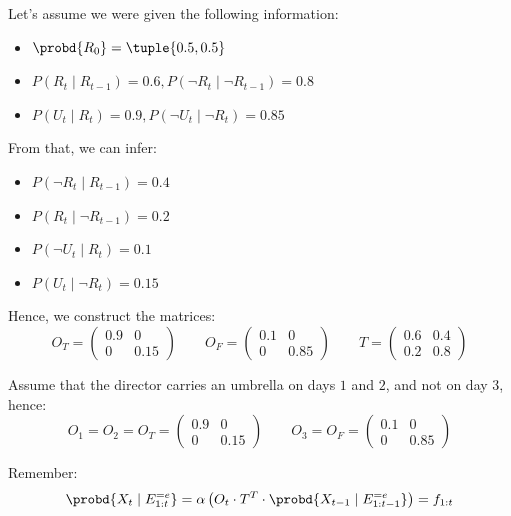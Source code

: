 
Let's assume we were given the following information:
\begin{itemize}
  \item $\probd{R_0} = \tuple{0.5, 0.5}$
  \item $P(R_{t} \mid R_{t-1}) = 0.6, P(\neg R_{t} \mid \neg R_{t-1}) = 0.8$
  \item $P(U_{t} \mid R_{t}) = 0.9, P(\neg U_{t} \mid \neg R_{t}) = 0.85$
\end{itemize}

From that, we can infer: 
\begin{itemize}
  \item $P(\neg R_{t} \mid R_{t-1}) = 0.4$
  \item $P(R_{t} \mid \neg R_{t-1}) = 0.2$
  \item $P(\neg U_{t} \mid R_{t}) = 0.1$
  \item $P(U_{t} \mid \neg R_{t}) = 0.15$
\end{itemize}

Hence, we construct the matrices:
\[
O_T = \begin{pmatrix}
0.9 & 0 \\
0 & 0.15
\end{pmatrix}
\qquad
O_F = \begin{pmatrix}
0.1 & 0 \\
0 & 0.85
\end{pmatrix}
\qquad
T = \begin{pmatrix}
0.6 & 0.4 \\
0.2 & 0.8
\end{pmatrix}
\]

Assume that the director carries an umbrella on days $1$ and $2$, and not on day $3$, hence:
\[
O_1 = O_2 = O_T = \begin{pmatrix}
0.9 & 0 \\
0 & 0.15
\end{pmatrix}
\qquad
O_3 = O_F = \begin{pmatrix}
0.1 & 0 \\
0 & 0.85
\end{pmatrix}
\]

Remember:
\[
\probd{X_t \mid E_{1:t}^{=e}} = 
\alpha \left(
O_t \cdot T^T \cdot \probd{X_{t-1} \mid E_{1:t-1}^{=e}}
\right) = f_{1:t}
\]


